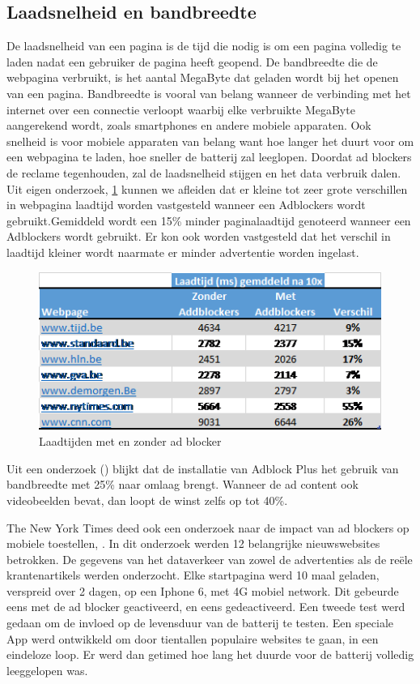 \documentclass[pdftex,a4paper,12pt,twoside]{report}
\begin{document}
\subsection{Laadsnelheid en bandbreedte}
\label{sec Laadsnelheid en bandbreedte}
De laadsnelheid van een pagina is de tijd die nodig is om een pagina volledig te laden nadat een gebruiker de pagina heeft geopend. De bandbreedte die de webpagina verbruikt, is het aantal MegaByte dat geladen wordt bij het openen van een pagina. Bandbreedte is vooral van belang wanneer de verbinding met het internet over een connectie verloopt waarbij elke verbruikte MegaByte aangerekend wordt, zoals smartphones en andere mobiele apparaten. Ook snelheid is voor mobiele apparaten van belang want hoe langer het duurt voor om een webpagina te laden, hoe sneller de batterij zal leeglopen. Doordat ad blockers de reclame tegenhouden, zal de laadsnelheid stijgen en het data verbruik dalen.
\\

Uit eigen onderzoek, \ref{fig: LoadTimes} kunnen we afleiden dat er kleine tot zeer grote verschillen in webpagina laadtijd worden vastgesteld wanneer een Adblockers wordt gebruikt.Gemiddeld wordt een 15\% minder paginalaadtijd genoteerd wanneer een Adblockers wordt gebruikt. Er kon ook worden vastgesteld dat het verschil in laadtijd kleiner wordt naarmate er minder advertentie worden ingelast.

\begin{figure}[h!]
\centering
\includegraphics[width=12cm]{img/Eigenonderzoek}
\caption{Laadtijden met en zonder ad blocker}
\label{fig: LoadTimes}
\end{figure}

Uit een onderzoek (\cite{Fraser2015}) blijkt dat de installatie van Adblock Plus het gebruik van bandbreedte met 25\% naar omlaag brengt. Wanneer de ad content ook videobeelden bevat, dan loopt de winst zelfs op tot 40\%. 

The New York Times deed ook een onderzoek naar de impact van ad blockers op mobiele toestellen, \cite{nytimes2015}.
In dit onderzoek werden 12 belangrijke nieuwswebsites betrokken. De gegevens van het dataverkeer van zowel de advertenties als de reële krantenartikels werden onderzocht. Elke startpagina werd 10 maal geladen, verspreid over 2 dagen, op een Iphone 6, met 4G mobiel network. Dit gebeurde eens met de ad blocker geactiveerd, en eens gedeactiveerd. Een tweede test werd gedaan om de invloed op de levensduur van de batterij te testen. Een speciale App werd ontwikkeld om door tientallen populaire websites te gaan, in een eindeloze loop. Er werd dan getimed hoe lang het duurde voor de batterij volledig leeggelopen was.
\end{document}
